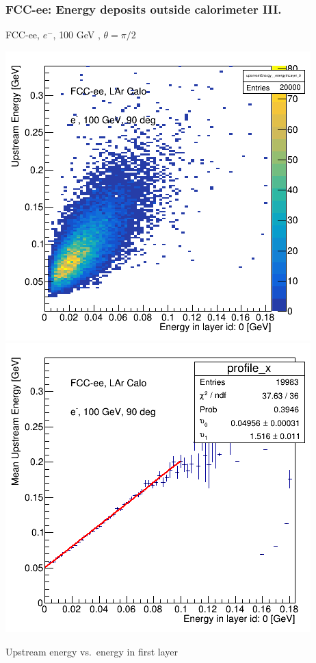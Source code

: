 \documentclass[aspectratio=169]{beamer}
\newcommand{\redtext}[1]{%
  \textcolor{myRed}{#1}
}
\begin{document}
\begin{frame}
  \frametitle{FCC-ee: Energy deposits outside calorimeter III.}

  \centering
  FCC-ee, $e^{-}$, \redtext{100 GeV}, $\theta = \pi/2$ \\[1.5ex]
  \begin{adjustwidth}{-9mm}{-9mm}
    \includegraphics[width=0.49\linewidth]{figures/12layers/hist_upstream_vs_layer_0_90deg_100GeV.png}
    \includegraphics[width=0.49\linewidth]{figures/12layers/profile_upstream_vs_layer_0_90deg_100GeV.png}
  \end{adjustwidth}
  \redtext{Upstream} energy vs.\ energy in first layer
\end{frame}
\end{document}
